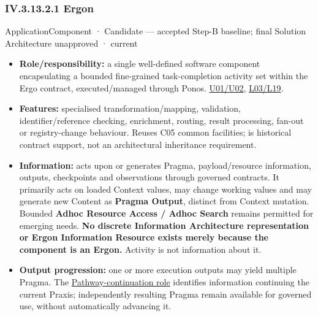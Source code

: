 \subsubsection*{IV.3.13.2.1 Ergon}
\label{navigation:IV.3.13.2.1}

\label{element:49c9eb2bef0c47b8b5328621d5fc5479}
{\small ApplicationComponent · Candidate — accepted Step-B baseline; final Solution Architecture unapproved · current}\par

\begin{itemize}


\item \textbf{Role/responsibility:} a single well-defined software component encapsulating
  a bounded fine-grained task-completion activity set within the Ergo contract,
  executed/managed through Ponos. \href{\detokenize{../../../../../docs/markdown/05-information-systems-architecture/sources.md#u02}}{U01/U02}, \href{\detokenize{../../../../../docs/markdown/05-information-systems-architecture/sources.md#l03}}{L03/L19}.

\item \textbf{Features:} specialised transformation/mapping, validation, identifier/reference
  checking, enrichment, routing, result processing, fan-out or registry-change
  behaviour. Reuses C05 common facilities; \texttt{} is historical contract
  support, not an architectural inheritance requirement.

\item \textbf{Information:} acts upon or generates Pragma, payload/resource information,
  outputs, checkpoints and observations through governed contracts. It primarily
  acts on loaded Context values, may change working values and may generate new
  Content as \textbf{Pragma Output}, distinct from Context mutation. Bounded \textbf{Adhoc
  Resource Access / Adhoc Search} remains permitted for emerging needs. \textbf{No discrete
  Information Architecture representation or Ergon Information Resource exists
  merely because the component is an Ergon.} Activity is not information about it.

\item \textbf{Output progression:} one or more execution outputs may yield multiple Pragma.
  The \hyperref[element:27ad143e7c784e378556af8a57c438f7]{Pathway-continuation role}
  identifies information continuing the current Praxis; independently resulting
  Pragma remain available for governed use, without automatically advancing it.


\end{itemize}
